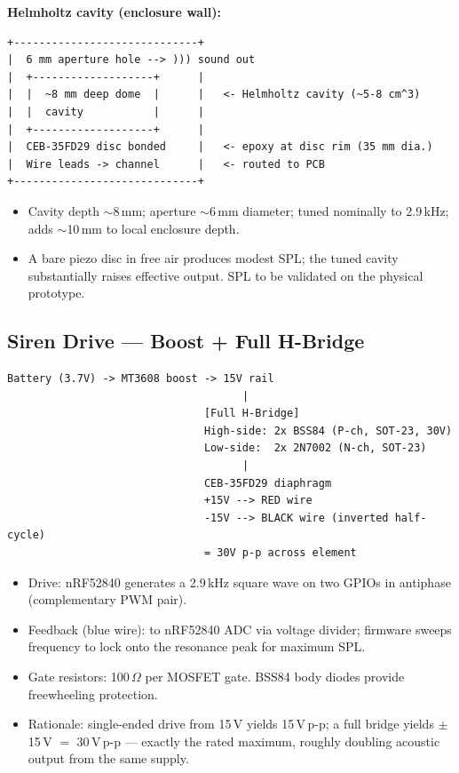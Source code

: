 \documentclass[11pt,a4paper]{article}
\begin{document}
\textbf{Helmholtz cavity (enclosure wall):}

\begin{Verbatim}[frame=single,fontsize=\small]
+-----------------------------+
|  6 mm aperture hole --> ))) sound out
|  +-------------------+      |
|  |  ~8 mm deep dome  |      |   <- Helmholtz cavity (~5-8 cm^3)
|  |  cavity           |      |
|  +-------------------+      |
|  CEB-35FD29 disc bonded     |   <- epoxy at disc rim (35 mm dia.)
|  Wire leads -> channel      |   <- routed to PCB
+-----------------------------+
\end{Verbatim}

\begin{itemize}
  \item Cavity depth $\sim$8\,mm; aperture $\sim$6\,mm diameter; tuned nominally to 2.9\,kHz; adds $\sim$10\,mm to local enclosure depth.
  \item A bare piezo disc in free air produces modest SPL; the tuned cavity substantially raises effective output. SPL to be validated on the physical prototype.
\end{itemize}

\subsection{Siren Drive --- Boost + Full H-Bridge}

\begin{Verbatim}[frame=single,fontsize=\small]
Battery (3.7V) -> MT3608 boost -> 15V rail
                                     |
                               [Full H-Bridge]
                               High-side: 2x BSS84 (P-ch, SOT-23, 30V)
                               Low-side:  2x 2N7002 (N-ch, SOT-23)
                                     |
                               CEB-35FD29 diaphragm
                               +15V --> RED wire
                               -15V --> BLACK wire (inverted half-cycle)
                               = 30V p-p across element
\end{Verbatim}

\begin{itemize}
  \item Drive: nRF52840 generates a 2.9\,kHz square wave on two GPIOs in antiphase (complementary PWM pair).
  \item Feedback (blue wire): to nRF52840 ADC via voltage divider; firmware sweeps frequency to lock onto the resonance peak for maximum SPL.
  \item Gate resistors: 100\,$\Omega$ per MOSFET gate. BSS84 body diodes provide freewheeling protection.
  \item Rationale: single-ended drive from 15\,V yields 15\,V\,p-p; a full bridge yields $\pm$15\,V $=$ 30\,V\,p-p --- exactly the rated maximum, roughly doubling acoustic output from the same supply.
\end{itemize}
\end{document}

